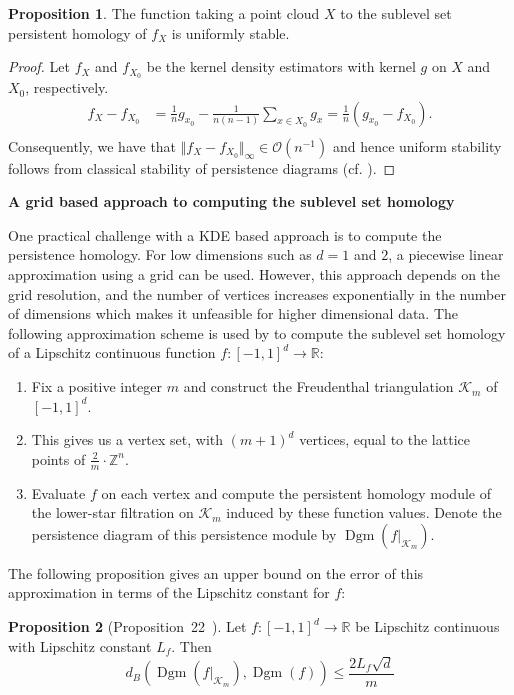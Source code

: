\documentclass[10pt,a4paper]{article}
\theoremstyle{definition}
\newtheorem{prop}{Proposition}[thm]
\newcommand{\R}{\mathbb{R}}
\begin{document}
\begin{prop}
	The function taking a point cloud $X$ to the sublevel set persistent homology of $f_X$ is uniformly stable.
\end{prop}
\begin{proof}
	Let $f_X$ and $f_{X_0}$ be the kernel density estimators with kernel $g$ on $X$ and $X_0$, respectively.
	\begin{align*}
		f_X - f_{X_0} &= \frac{1}{n}g_{x_0} -\frac{1}{n(n-1)}\sum_{x\in X_0}g_x
		= \frac{1}{n}\left(g_{x_0} - f_{X_0}\right). \\
	\end{align*}
	Consequently, we have that $\Vert f_X - f_{X_0}\Vert_\infty\in\mathcal{O}(n^{-1})$ and hence uniform stability follows from classical stability of persistence diagrams (cf. \autocite{cohen2005stability}).
\end{proof}

\textbf{A grid based approach to computing the sublevel set homology}

One practical challenge with a KDE based approach is to compute the persistence homology. For low dimensions such as $d=1$ and $2$, a piecewise linear approximation using a grid can be used. However, this approach depends on the grid resolution, and the number of vertices increases exponentially in the number of dimensions which makes it unfeasible for higher dimensional data. The following approximation scheme is used by \autocite{Hoefgeest2022} to compute the sublevel set homology of a Lipschitz continuous function $f\colon[-1,1]^d\to\R$:
\begin{enumerate}
	\item Fix a positive integer $m$ and construct the Freudenthal triangulation $\mathcal{K}_m$ of $[-1,1]^d$.
	\item This gives us a vertex set, with $(m+1)^d$ vertices, equal to the lattice points of $\frac{2}{m}\cdot\mathbb{Z}^n$.
	\item Evaluate $f$ on each vertex and compute the persistent homology module of the lower-star filtration on $\mathcal{K}_m$ induced by these function values. Denote the persistence diagram of this persistence module by $\operatorname{Dgm}(f\vert_{\mathcal{K}_m})$.
\end{enumerate}
The following proposition gives an upper bound on the error of this approximation in terms of the Lipschitz constant for $f$:
\begin{prop}[Proposition~22~\autocite{Hoefgeest2022}]
	Let $f\colon[-1,1]^d\to\R$ be Lipschitz continuous with Lipschitz constant $L_f$. Then
	$$
	d_B\left(\operatorname{Dgm}(f\vert_{\mathcal{K}_m}), \operatorname{Dgm}(f)\right)\leq \frac{2L_f\sqrt{d}}{m}
	$$
\end{prop}
\end{document}
